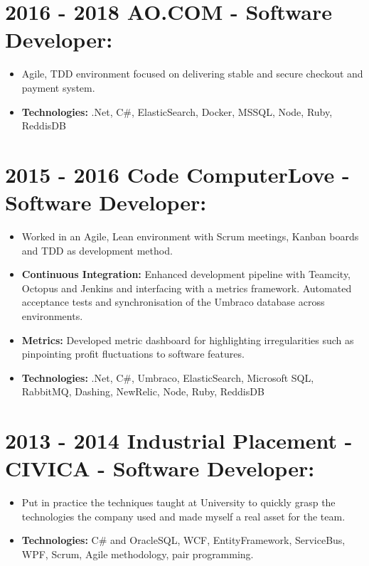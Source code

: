 \documentclass[12pt,a4paper]{res}
\begin{document}
\begin{resume}
\section{\bf 2016 - 2018 \hspace{0.3mm} AO.COM - Software Developer:}
\begin{itemize}
	\item[] Agile, TDD environment focused on delivering stable and secure checkout and payment system.
	\item \textbf{Technologies:} .Net, C\#, ElasticSearch, Docker, MSSQL, Node, Ruby, ReddisDB
	\end{itemize}
\section{\bf 2015 - 2016 \hspace{0.3mm} Code ComputerLove - Software Developer:}
\vspace{5mm}    
	\begin{itemize}
	\item[] Worked in an Agile, Lean environment with Scrum meetings, Kanban boards and TDD as development method.
	\item \textbf{Continuous Integration:} Enhanced development pipeline with Teamcity, Octopus and Jenkins and interfacing with a metrics framework. Automated acceptance tests and synchronisation of the Umbraco database across environments.
	\item \textbf{Metrics:} Developed metric dashboard for highlighting irregularities such as pinpointing profit fluctuations to software features.
	\item \textbf{Technologies:} .Net, C\#, Umbraco, ElasticSearch, Microsoft SQL, RabbitMQ, Dashing, NewRelic, Node, Ruby, ReddisDB
	\end{itemize}
	
\section{\bf 2013 - 2014 \hspace{0.5mm} Industrial Placement - CIVICA - Software Developer:}
\vspace{5mm}    
	\begin{itemize}
	\item[] Put in practice the techniques taught at University to quickly grasp the technologies the company used and made myself a real asset for the team.
	\item{\bf Technologies:} C\# and OracleSQL, WCF, EntityFramework, ServiceBus, WPF, Scrum, Agile methodology, pair programming.
	\end{itemize}


\end{resume}
\end{document}
